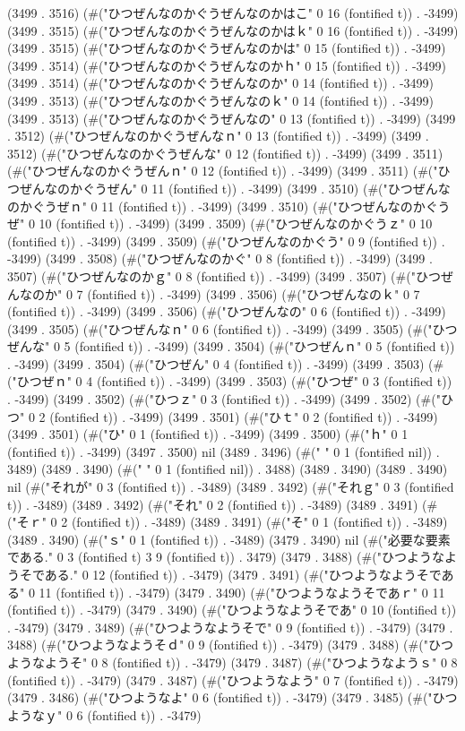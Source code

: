 (3499 . 3516) (#("ひつぜんなのかぐうぜんなのかはこ" 0 16 (fontified t)) . -3499) (3499 . 3515) (#("ひつぜんなのかぐうぜんなのかはｋ" 0 16 (fontified t)) . -3499) (3499 . 3515) (#("ひつぜんなのかぐうぜんなのかは" 0 15 (fontified t)) . -3499) (3499 . 3514) (#("ひつぜんなのかぐうぜんなのかｈ" 0 15 (fontified t)) . -3499) (3499 . 3514) (#("ひつぜんなのかぐうぜんなのか" 0 14 (fontified t)) . -3499) (3499 . 3513) (#("ひつぜんなのかぐうぜんなのｋ" 0 14 (fontified t)) . -3499) (3499 . 3513) (#("ひつぜんなのかぐうぜんなの" 0 13 (fontified t)) . -3499) (3499 . 3512) (#("ひつぜんなのかぐうぜんなｎ" 0 13 (fontified t)) . -3499) (3499 . 3512) (#("ひつぜんなのかぐうぜんな" 0 12 (fontified t)) . -3499) (3499 . 3511) (#("ひつぜんなのかぐうぜんｎ" 0 12 (fontified t)) . -3499) (3499 . 3511) (#("ひつぜんなのかぐうぜん" 0 11 (fontified t)) . -3499) (3499 . 3510) (#("ひつぜんなのかぐうぜｎ" 0 11 (fontified t)) . -3499) (3499 . 3510) (#("ひつぜんなのかぐうぜ" 0 10 (fontified t)) . -3499) (3499 . 3509) (#("ひつぜんなのかぐうｚ" 0 10 (fontified t)) . -3499) (3499 . 3509) (#("ひつぜんなのかぐう" 0 9 (fontified t)) . -3499) (3499 . 3508) (#("ひつぜんなのかぐ" 0 8 (fontified t)) . -3499) (3499 . 3507) (#("ひつぜんなのかｇ" 0 8 (fontified t)) . -3499) (3499 . 3507) (#("ひつぜんなのか" 0 7 (fontified t)) . -3499) (3499 . 3506) (#("ひつぜんなのｋ" 0 7 (fontified t)) . -3499) (3499 . 3506) (#("ひつぜんなの" 0 6 (fontified t)) . -3499) (3499 . 3505) (#("ひつぜんなｎ" 0 6 (fontified t)) . -3499) (3499 . 3505) (#("ひつぜんな" 0 5 (fontified t)) . -3499) (3499 . 3504) (#("ひつぜんｎ" 0 5 (fontified t)) . -3499) (3499 . 3504) (#("ひつぜん" 0 4 (fontified t)) . -3499) (3499 . 3503) (#("ひつぜｎ" 0 4 (fontified t)) . -3499) (3499 . 3503) (#("ひつぜ" 0 3 (fontified t)) . -3499) (3499 . 3502) (#("ひつｚ" 0 3 (fontified t)) . -3499) (3499 . 3502) (#("ひつ" 0 2 (fontified t)) . -3499) (3499 . 3501) (#("ひｔ" 0 2 (fontified t)) . -3499) (3499 . 3501) (#("ひ" 0 1 (fontified t)) . -3499) (3499 . 3500) (#("ｈ" 0 1 (fontified t)) . -3499) (3497 . 3500) nil (3489 . 3496) (#(" " 0 1 (fontified nil)) . 3489) (3489 . 3490) (#(" " 0 1 (fontified nil)) . 3488) (3489 . 3490) (3489 . 3490) nil (#("それが" 0 3 (fontified t)) . -3489) (3489 . 3492) (#("それｇ" 0 3 (fontified t)) . -3489) (3489 . 3492) (#("それ" 0 2 (fontified t)) . -3489) (3489 . 3491) (#("そｒ" 0 2 (fontified t)) . -3489) (3489 . 3491) (#("そ" 0 1 (fontified t)) . -3489) (3489 . 3490) (#("ｓ" 0 1 (fontified t)) . -3489) (3479 . 3490) nil (#("必要な要素である." 0 3 (fontified t) 3 9 (fontified t)) . 3479) (3479 . 3488) (#("ひつようなようそである." 0 12 (fontified t)) . -3479) (3479 . 3491) (#("ひつようなようそである" 0 11 (fontified t)) . -3479) (3479 . 3490) (#("ひつようなようそであｒ" 0 11 (fontified t)) . -3479) (3479 . 3490) (#("ひつようなようそであ" 0 10 (fontified t)) . -3479) (3479 . 3489) (#("ひつようなようそで" 0 9 (fontified t)) . -3479) (3479 . 3488) (#("ひつようなようそｄ" 0 9 (fontified t)) . -3479) (3479 . 3488) (#("ひつようなようそ" 0 8 (fontified t)) . -3479) (3479 . 3487) (#("ひつようなようｓ" 0 8 (fontified t)) . -3479) (3479 . 3487) (#("ひつようなよう" 0 7 (fontified t)) . -3479) (3479 . 3486) (#("ひつようなよ" 0 6 (fontified t)) . -3479) (3479 . 3485) (#("ひつようなｙ" 0 6 (fontified t)) . -3479) 